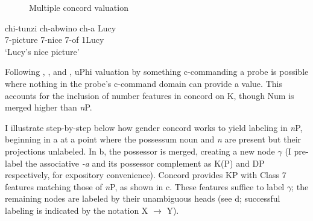 \documentclass[output=paper
,modfonts
,nonflat]{langsci/langscibook}
\begin{document}
\begin{figure}
	\caption{Multiple concord valuation\label{ex-carstens:28}}
	\begin{exe} 
	\end{exe}
	\end{figure}
\begin{exe}
 	\ex\label{ex-carstens:28c}
	\gll chi-tunzi    ch-abwino   ch-a Lucy\\
	7-picture   7-nice           7-of 1Lucy\\
	\glt `Lucy's nice picture' 
\end{exe}

Following \citet{Bejar_Rezac2009}, \citet{Toosarvandani_Van_Urk2014}, and \citet{Carstens2016}, uPhi valuation by something c-commanding a probe is possible where nothing in the probe’s c-command domain can provide a value. This accounts for the inclusion of number features in concord on K, though Num is merged higher than \textit{n}P.

I illustrate step-by-step below how gender concord works to yield labeling in \textit{n}P, beginning in a at a point where the possessum noun and \textit{n} are present but their projections unlabeled. In b, the possessor is merged, creating a new node $\gamma$ (I pre-label the associative \textit{-a} and its possessor complement as K(P) and DP respectively, for expository convenience). Concord provides KP with Class 7 features matching those of \textit{n}P, as shown in c. These features suffice to label $\gamma$;  the remaining nodes are labeled by their unambiguous heads (see d; successful labeling is indicated by the notation X $\rightarrow$ Y).
\end{document}
